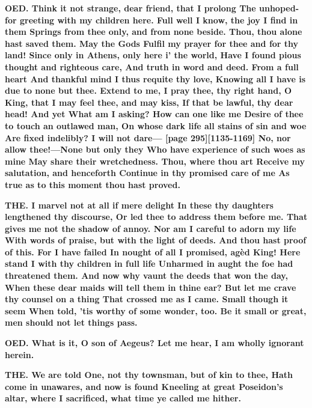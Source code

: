 \documentclass[11pt,letter]{book}
\begin{document}
\par \textbf{OED. Think it not strange, dear friend, that I prolong The unhoped-for greeting with my children here. Full well I know, the joy I find in them Springs from thee only, and from none beside. Thou, thou alone hast saved them. May the Gods Fulfil my prayer for thee and for thy land! Since only in Athens, only here i’ the world, Have I found pious thought and righteous care, And truth in word and deed. From a full heart And thankful mind I thus requite thy love, Knowing all I have is due to none but thee. Extend to me, I pray thee, thy right hand, O King, that I may feel thee, and may kiss, If that be lawful, thy dear head! And yet What am I asking? How can one like me Desire of thee to touch an outlawed man, On whose dark life all stains of sin and woe Are fixed indelibly? I will not dare— [page 295][1135-1169] No, nor allow thee!—None but only they Who have experience of such woes as mine May share their wretchedness. Thou, where thou art Receive my salutation, and henceforth Continue in thy promised care of me As true as to this moment thou hast proved.}
\par 

\par \textbf{THE. I marvel not at all if mere delight In these thy daughters lengthened thy discourse, Or led thee to address them before me. That gives me not the shadow of annoy. Nor am I careful to adorn my life With words of praise, but with the light of deeds. And thou hast proof of this. For I have failed In nought of all I promised, agèd King! Here stand I with thy children in full life Unharmed in aught the foe had threatened them. And now why vaunt the deeds that won the day, When these dear maids will tell them in thine ear? But let me crave thy counsel on a thing That crossed me as I came. Small though it seem When told, ’tis worthy of some wonder, too. Be it small or great, men should not let things pass.}
\par 

\par \textbf{OED. What is it, O son of Aegeus? Let me hear, I am wholly ignorant herein.}
\par 

\par \textbf{THE. We are told One, not thy townsman, but of kin to thee, Hath come in unawares, and now is found Kneeling at great Poseidon’s altar, where I sacrificed, what time ye called me hither.}
\par 
\end{document}
